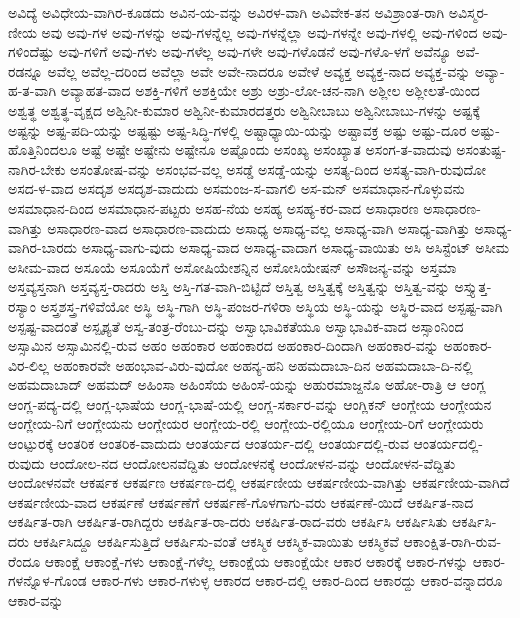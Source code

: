 {ಅವಿದ್ಯೆ
ಅವಿಧೇಯ-ವಾಗಿರ-ಕೂಡದು
ಅವಿನ-ಯ-ವನ್ನು
ಅವಿರಳ-ವಾಗಿ
ಅವಿವೇಕ-ತನ
ಅವಿಶ್ರಾಂತ-ರಾಗಿ
ಅವಿಸ್ಮರ-ಣೀಯ
ಅವು
ಅವು-ಗಳ
ಅವು-ಗಳನ್ನು
ಅವು-ಗಳನ್ನೆಲ್ಲ
ಅವು-ಗಳನ್ನೆಲ್ಲಾ
ಅವು-ಗಳನ್ನೇ
ಅವು-ಗಳಲ್ಲಿ
ಅವು-ಗಳಿಂದ
ಅವು-ಗಳಿಂದೆಷ್ಟು
ಅವು-ಗಳಿಗೆ
ಅವು-ಗಳು
ಅವು-ಗಳೆಲ್ಲ
ಅವು-ಗಳೇ
ಅವು-ಗಳೊಡನೆ
ಅವು-ಗಳೊ-ಳಗೆ
ಅವೆನ್ಯೂ
ಅವೆ-ರಡನ್ನೂ
ಅವೆಲ್ಲ
ಅವೆಲ್ಲ-ದರಿಂದ
ಅವೆಲ್ಲಾ
ಅವೇ
ಅವೇ-ನಾದರೂ
ಅವೇಳೆ
ಅವ್ಯಕ್ತ
ಅವ್ಯಕ್ತ-ನಾದ
ಅವ್ಯಕ್ತ-ವನ್ನು
ಅವ್ಯಾ-ಹ-ತ-ವಾಗಿ
ಅವ್ಯಾಹತ-ವಾದ
ಅಶಕ್ತಿ-ಗಳಿಗೆ
ಅಶಕ್ತಿಯೇ
ಅಶ್ರು
ಅಶ್ರು-ಲೋ-ಚನ-ನಾಗಿ
ಅಶ್ಲೀಲ
ಅಶ್ಲೀಲತೆ-ಯಿಂದ
ಅಶ್ವತ್ಥ
ಅಶ್ವತ್ಥ-ವೃಕ್ಷದ
ಅಶ್ವಿನೀ-ಕುಮಾರ
ಅಶ್ವಿನೀ-ಕುಮಾರದತ್ತರು
ಅಶ್ವಿನೀಬಾಬು
ಅಶ್ವಿನೀಬಾಬು-ಗಳನ್ನು
ಅಷ್ಟಕ್ಕೆ
ಅಷ್ಟನ್ನು
ಅಷ್ಟ-ಪದಿ-ಯನ್ನು
ಅಷ್ಟಷ್ಟು
ಅಷ್ಟ-ಸಿದ್ಧಿ-ಗಳಲ್ಲಿ
ಅಷ್ಟಾಧ್ಯಾಯಿ-ಯನ್ನು
ಅಷ್ಟಾವಕ್ರ
ಅಷ್ಟು
ಅಷ್ಟು-ದೂರ
ಅಷ್ಟು-ಹೊತ್ತಿನಿಂದಲೂ
ಅಷ್ಟೆ
ಅಷ್ಟೇ
ಅಷ್ಟೇನು
ಅಷ್ಟೇನೂ
ಅಷ್ಟೊಂದು
ಅಸಂಖ್ಯ
ಅಸಂಖ್ಯಾತ
ಅಸಂಗ-ತ-ವಾದುವು
ಅಸಂತುಷ್ಟ-ನಾಗಿರ-ಬೇಕು
ಅಸಂತೋಷ-ವನ್ನು
ಅಸಂಭವ-ವಲ್ಲ
ಅಸಡ್ಡೆ
ಅಸಡ್ಡೆ-ಯನ್ನು
ಅಸತ್ಯ-ದಿಂದ
ಅಸತ್ಯ-ವಾಗಿ-ರುವುದೋ
ಅಸದ-ಳ-ವಾದ
ಅಸದೃಶ
ಅಸದೃಶ-ವಾದುದು
ಅಸಮಂಜ-ಸ-ವಾಗಲಿ
ಅಸ-ಮನ್
ಅಸಮಾಧಾನ-ಗೊಳ್ಳುವನು
ಅಸಮಾಧಾನ-ದಿಂದ
ಅಸಮಾಧಾನ-ಪಟ್ಟರು
ಅಸಹ-ನೆಯ
ಅಸಹ್ಯ
ಅಸಹ್ಯ-ಕರ-ವಾದ
ಅಸಾಧಾರಣ
ಅಸಾಧಾರಣ-ವಾಗಿತ್ತು
ಅಸಾಧಾರಣ-ವಾದ
ಅಸಾಧಾರಣ-ವಾದುದು
ಅಸಾಧ್ಯ
ಅಸಾಧ್ಯ-ವಲ್ಲ
ಅಸಾಧ್ಯ-ವಾಗಿ
ಅಸಾಧ್ಯ-ವಾಗಿತ್ತು
ಅಸಾಧ್ಯ-ವಾಗಿರ-ಬಾರದು
ಅಸಾಧ್ಯ-ವಾಗು-ವುದು
ಅಸಾಧ್ಯ-ವಾದ
ಅಸಾಧ್ಯ-ವಾದಾಗ
ಅಸಾಧ್ಯ-ವಾಯಿತು
ಅಸಿ
ಅಸಿಸ್ಟೆಂಟ್
ಅಸೀಮ
ಅಸೀಮ-ವಾದ
ಅಸೂಯೆ
ಅಸೂಯೆಗೆ
ಅಸೋಷಿಯೇಶನ್ನಿನ
ಅಸೋಸಿಯೇಷನ್
ಅಸೌಜನ್ಯ-ವನ್ನು
ಅಸ್ತಮಾ
ಅಸ್ತವ್ಯಸ್ತನಾಗಿ
ಅಸ್ತವ್ಯಸ್ತ-ರಾದರು
ಅಸ್ತಿ
ಅಸ್ತಿ-ಗತ-ವಾಗಿ-ಬಿಟ್ಟಿದೆ
ಅಸ್ತಿತ್ವ
ಅಸ್ತಿತ್ವಕ್ಕೆ
ಅಸ್ತಿತ್ವನ್ನು
ಅಸ್ತಿತ್ವ-ವನ್ನು
ಅಸ್ತ್ಯುತ್ತ-ರಸ್ಯಾಂ
ಅಸ್ತ್ರಶಸ್ತ್ರ-ಗಳಿವೆಯೋ
ಅಸ್ಥಿ
ಅಸ್ಥಿ-ಗಾಗಿ
ಅಸ್ಥಿ-ಪಂಜರ-ಗಳಿರಾ
ಅಸ್ಥಿಯ
ಅಸ್ಥಿ-ಯನ್ನು
ಅಸ್ಥಿರ-ವಾದ
ಅಸ್ಪಷ್ಟ-ವಾಗಿ
ಅಸ್ಪಷ್ಟ-ವಾದಂತೆ
ಅಸ್ಪೃಶ್ಯತೆ
ಅಸ್ವ-ತಂತ್ರ-ರೆಂಬು-ದನ್ನು
ಅಸ್ವಾಭಾವಿಕತೆಯೂ
ಅಸ್ವಾಭಾವಿಕ-ವಾದ
ಅಸ್ಸಾಂನಿಂದ
ಅಸ್ಸಾಮಿನ
ಅಸ್ಸಾಮಿನಲ್ಲಿ-ರುವ
ಅಹಂ
ಅಹಂಕಾರ
ಅಹಂಕಾರದ
ಅಹಂಕಾರ-ದಿಂದಾಗಿ
ಅಹಂಕಾರ-ವನ್ನು
ಅಹಂಕಾರ-ವಿರ-ಲಿಲ್ಲ
ಅಹಂಕಾರವೇ
ಅಹಂಭಾವ-ವಿರು-ವುದೋ
ಅಹನ್ಯ-ಹನಿ
ಅಹಮದಾಬಾ-ದಿನ
ಅಹಮದಾಬಾ-ದಿ-ನಲ್ಲಿ
ಅಹಮದಾಬಾದ್
ಅಹಮದ್
ಅಹಿಂಸಾ
ಅಹಿಂಸೆಯ
ಅಹಿಂಸೆ-ಯನ್ನು
ಅಹುರಮಾಜ್ದನೊ
ಅಹೋ-ರಾತ್ರಿ
ಆ
ಆಂಗ್ಲ
ಆಂಗ್ಲ-ಪದ್ಯ-ದಲ್ಲಿ
ಆಂಗ್ಲ-ಭಾಷೆಯ
ಆಂಗ್ಲ-ಭಾಷೆ-ಯಲ್ಲಿ
ಆಂಗ್ಲ-ಸರ್ಕಾರ-ವನ್ನು
ಆಂಗ್ಲಿಕನ್
ಆಂಗ್ಲೇಯ
ಆಂಗ್ಲೇಯನ
ಆಂಗ್ಲೇಯ-ನಿಗೆ
ಆಂಗ್ಲೇಯನು
ಆಂಗ್ಲೇಯರ
ಆಂಗ್ಲೇಯ-ರಲ್ಲಿ
ಆಂಗ್ಲೇಯ-ರಲ್ಲಿಯೂ
ಆಂಗ್ಲೇಯ-ರಿಗೆ
ಆಂಗ್ಲೇಯರು
ಆಂಟ್ಪುರಕ್ಕೆ
ಆಂತರಿಕ
ಆಂತರಿಕ-ವಾದುದು
ಆಂತರ್ಯದ
ಆಂತರ್ಯ-ದಲ್ಲಿ
ಆಂತರ್ಯದಲ್ಲಿ-ರುವ
ಆಂತರ್ಯದಲ್ಲಿ-ರುವುದು
ಆಂದೋಲ-ನದ
ಆಂದೋಲನವೆದ್ದಿತು
ಆಂದೋಳನಕ್ಕೆ
ಆಂದೋಳನ-ವನ್ನು
ಆಂದೋಳನ-ವೆದ್ದಿತು
ಆಂದೋಳನವೇ
ಆಕರ್ಷಕ
ಆಕರ್ಷಣ
ಆಕರ್ಷಣ-ದಲ್ಲಿ
ಆಕರ್ಷಣೀಯ
ಆಕರ್ಷಣೀಯ-ವಾಗಿತ್ತು
ಆಕರ್ಷಣೀಯ-ವಾಗಿದೆ
ಆಕರ್ಷಣೀಯ-ವಾದ
ಆಕರ್ಷಣೆ
ಆಕರ್ಷಣೆಗೆ
ಆಕರ್ಷಣೆ-ಗೊಳಗಾಗು-ವರು
ಆಕರ್ಷಣೆ-ಯಿದೆ
ಆಕರ್ಷಿತ-ನಾದ
ಆಕರ್ಷಿತ-ರಾಗಿ
ಆಕರ್ಷಿತ-ರಾಗಿದ್ದರು
ಆಕರ್ಷಿತ-ರಾ-ದರು
ಆಕರ್ಷಿತ-ರಾದ-ವರು
ಆಕರ್ಷಿಸಿ
ಆಕರ್ಷಿಸಿತು
ಆಕರ್ಷಿಸಿ-ದರು
ಆಕರ್ಷಿಸಿದ್ದೂ
ಆಕರ್ಷಿಸುತ್ತಿದೆ
ಆಕರ್ಷಿಸು-ವಂತೆ
ಆಕಸ್ಮಿಕ
ಆಕಸ್ಮಿಕ-ವಾಯಿತು
ಆಕಸ್ಮಿಕವೆ
ಆಕಾಂಕ್ಷಿತ-ರಾಗಿ-ರುವ-ರೆಂದೂ
ಆಕಾಂಕ್ಷೆ
ಆಕಾಂಕ್ಷೆ-ಗಳು
ಆಕಾಂಕ್ಷೆ-ಗಳೆಲ್ಲ
ಆಕಾಂಕ್ಷೆಯ
ಆಕಾಂಕ್ಷೆಯೇ
ಆಕಾರ
ಆಕಾರಕ್ಕೆ
ಆಕಾರ-ಗಳನ್ನು
ಆಕಾರ-ಗಳನ್ನೊಳ-ಗೊಂಡ
ಆಕಾರ-ಗಳು
ಆಕಾರ-ಗಳುಳ್ಳ
ಆಕಾರದ
ಆಕಾರ-ದಲ್ಲಿ
ಆಕಾರ-ದಿಂದ
ಆಕಾರದ್ದು
ಆಕಾರ-ವನ್ನಾದರೂ
ಆಕಾರ-ವನ್ನು
}
